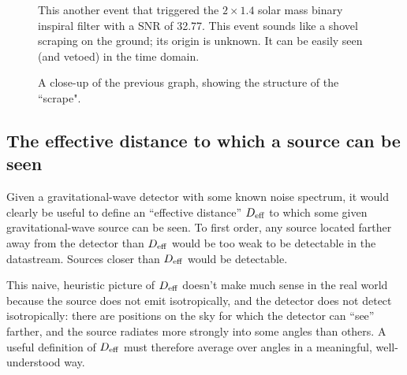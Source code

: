 \begin{figure}
\begin{center}
\caption{ \label{f:scrape1}
This another event that triggered the $2\times 1.4$ solar mass binary
inspiral filter with a SNR of 32.77.  This event sounds like a shovel
scraping on the ground; its origin is unknown.  It can be easily seen
(and vetoed) in the time domain.}
\end{center}
\end{figure}

\begin{figure}
\begin{center}
\caption{ \label{f:scrape2}
A close-up of the previous graph, showing the structure of the ``scrape".}
\end{center}
\end{figure}
\clearpage

\clearpage
\subsection{The effective distance to which a source can be seen}
\label{ss:eff_distdef}
\par\noindent

Given a gravitational-wave detector with some known noise spectrum, it
would clearly be useful to define an ``effective distance'' $D_{\rm
eff}$ to which some given gravitational-wave source can be seen.  To
first order, any source located farther away from the detector than
$D_{\rm eff}$ would be too weak to be detectable in the datastream.
Sources closer than $D_{\rm eff}$ would be detectable.

This naive, heuristic picture of $D_{\rm eff}$ doesn't make much sense
in the real world because the source does not emit isotropically, and
the detector does not detect isotropically: there are positions on the
sky for which the detector can ``see'' farther, and the source
radiates more strongly into some angles than others.  A useful
definition of $D_{\rm eff}$ must therefore average over angles in a
meaningful, well-understood way.

